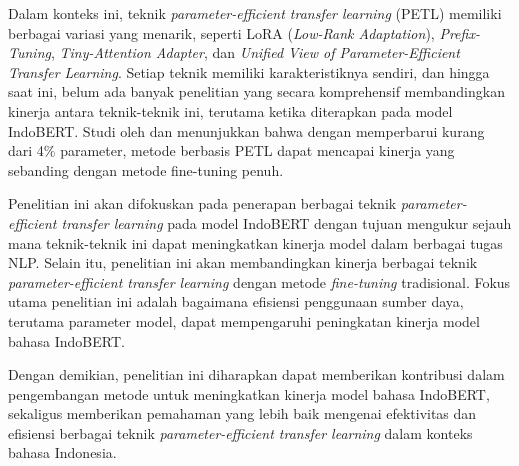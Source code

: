 Dalam konteks ini, teknik \textit{parameter-efficient transfer learning} (PETL) memiliki berbagai variasi yang menarik, seperti LoRA (\textit{Low-Rank Adaptation}), \textit{Prefix-Tuning}, \textit{Tiny-Attention Adapter}, dan \textit{Unified View of Parameter-Efficient Transfer Learning}. Setiap teknik memiliki karakteristiknya sendiri, dan hingga saat ini, belum ada banyak penelitian yang secara komprehensif membandingkan kinerja antara teknik-teknik ini, terutama ketika diterapkan pada model IndoBERT. Studi oleh \citeauthor{parameter} dan \citeauthor{uvpl} menunjukkan bahwa dengan memperbarui kurang dari 4\% parameter, metode berbasis PETL dapat mencapai kinerja yang sebanding dengan metode fine-tuning penuh.

Penelitian ini akan difokuskan pada penerapan berbagai teknik \textit{parameter-efficient transfer learning} pada model IndoBERT dengan tujuan mengukur sejauh mana teknik-teknik ini dapat meningkatkan kinerja model dalam berbagai tugas NLP. Selain itu, penelitian ini akan membandingkan kinerja berbagai teknik \textit{parameter-efficient transfer learning} dengan metode \textit{fine-tuning} tradisional. Fokus utama penelitian ini adalah bagaimana efisiensi penggunaan sumber daya, terutama parameter model, dapat mempengaruhi peningkatan kinerja model bahasa IndoBERT.

Dengan demikian, penelitian ini diharapkan dapat memberikan kontribusi dalam pengembangan metode untuk meningkatkan kinerja model bahasa IndoBERT, sekaligus memberikan pemahaman yang lebih baik mengenai efektivitas dan efisiensi berbagai teknik \textit{parameter-efficient transfer learning} dalam konteks bahasa Indonesia.